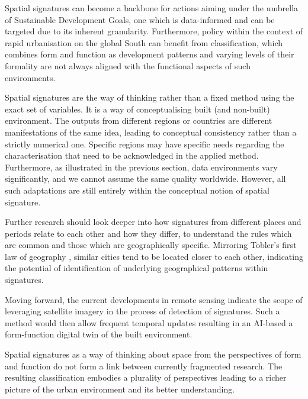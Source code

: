 Spatial signatures can become a backbone for actions aiming under the umbrella of
Sustainable Development Goals, one which is data-informed and can be targeted due to its
inherent granularity. Furthermore, policy within the context of rapid urbanisation on
the global South can benefit from classification, which combines form and function as
development patterns and varying levels of their formality are not always aligned with
the functional aspects of such environments.

Spatial signatures are the way of thinking rather than a fixed method using the exact
set of variables. It is a way of conceptualising built (and non-built) environment. The
outputs from different regions or countries are different manifestations of the same
idea, leading to conceptual consistency rather than a strictly numerical one. Specific
regions may have specific needs regarding the characterisation that need to be
acknowledged in the applied method. Furthermore, as illustrated in the previous section,
data environments vary significantly, and we cannot assume the same quality worldwide.
However, all such adaptations are still entirely within the conceptual notion of spatial
signature.

Further research should look deeper into how signatures from different places and
periods relate to each other and how they differ, to understand the rules which are
common and those which are geographically specific. Mirroring Tobler's first law of
geography \citep{tobler1970computer}, similar cities tend to be located closer to each
other, indicating the potential of identification of underlying geographical patterns
within signatures.

Moving forward, the current developments in remote sensing indicate the scope of
leveraging satellite imagery in the process of detection of signatures. Such a method
would then allow frequent temporal updates resulting in an AI-based a form-function
digital twin of the built environment.

Spatial signatures as a way of thinking about space from the perspectives of form and
function do not form a link between currently fragmented research. The resulting
classification embodies a plurality of perspectives leading to a richer picture of the
urban environment and its better understanding.

